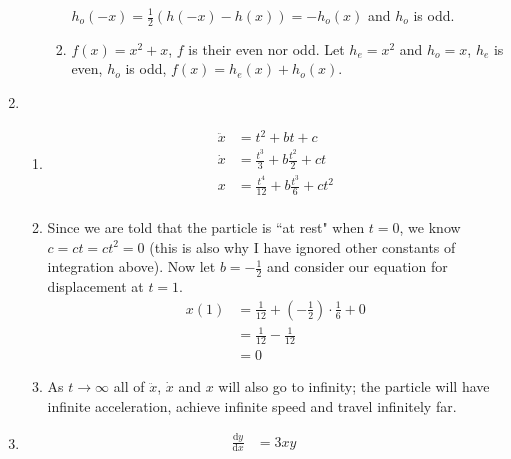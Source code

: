\documentclass[10pt]{article}
\newcommand*{\dydx}[0]{\frac{\text{d}y}{\text{d}x}}
\begin{document}
\begin{enumerate}
\begin{enumerate}
\begin{enumerate}
                        $h_o(-x) = \frac{1}{2}(h(-x) - h(x)) = -h_o(x)$  and $h_o$ is odd.
                    \item $f(x) = x^2 + x$, $f$ is their even nor odd. Let $h_e
                        = x^2$ and $h_o = x$, $h_e$ is even, $h_o$ is odd,
                            $f(x) = h_e(x) + h_o(x)$.
                    \end{enumerate}
            \end{enumerate}
            \item
                \begin{enumerate}
                    \item 
                        \begin{align*}
                            \ddot{x} &= t^2 + bt + c \\
                            \dot{x} &= \frac{t^3}{3} + b\frac{t^2}{2} + ct \\
                            x &= \frac{t^4}{12} + b\frac{t^3}{6} + ct^2 \\
                        \end{align*}
                    \item Since we are told that the particle is ``at rest"
                        when $t = 0$, we know $c = ct = ct^2 = 0$ (this is also
                        why I have ignored other constants of integration
                        above). Now let $b = -\tfrac{1}{2}$ and consider our
                        equation for displacement at $t = 1$.
                        \begin{align*}
                            x(1) &= \frac{1}{12} + (-\frac{1}{2})\cdot\frac{1}{6} + 0 \\
                                 &= \frac{1}{12} - \frac{1}{12} \\
                                 &=0
                        \end{align*}
                    \item As $t \rightarrow \infty$ all of $\ddot{x}$,
                        $\dot{x}$ and $x$ will also go to infinity; the
                        particle will have infinite acceleration, achieve
                        infinite speed and travel infinitely far.
                \end{enumerate}
            \item
                \begin{align*}
                    \dydx &= 3xy \\

\end{align*}
\end{enumerate}
\end{document}
